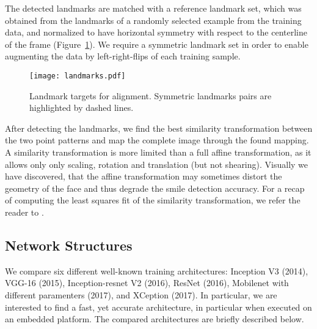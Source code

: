 \documentclass[conference]{IEEEtran}
\begin{document}
The detected landmarks are matched with a reference landmark set, which was obtained from the landmarks of a randomly selected example from the training data, and normalized to have horizontal symmetry with respect to the centerline of the frame (Figure~\ref{fig:landmarks}). We require a symmetric landmark set in order to enable augmenting the data by left-right-flips of each training sample.


\begin{figure}
\centering
\texttt{[image: landmarks.pdf]}
\caption{Landmark targets for alignment. Symmetric landmarks pairs are highlighted by dashed lines.}\label{fig:landmarks}
\end{figure}


After detecting the landmarks, we find the best similarity transformation between the two point patterns and map the complete image through the found mapping. A similarity transformation is more limited than a full affine transformation, as it allows only only scaling, rotation and translation (but not shearing). Visually we have discovered, that the affine transformation may sometimes distort the geometry of the face and thus degrade the smile detection accuracy. For a recap of computing the least squares fit of the similarity transformation, we refer the reader to \cite{bai2018}.


\subsection{Network Structures}

We compare six different well-known training architectures: Inception V3 (2014), VGG-16 (2015), Inception-resnet V2 (2016), ResNet (2016), Mobilenet with different paramenters (2017), and XCeption (2017). In particular, we are interested to find a fast, yet accurate architecture, in particular when executed on an embedded platform. The compared architectures are briefly described below.
\end{document}
